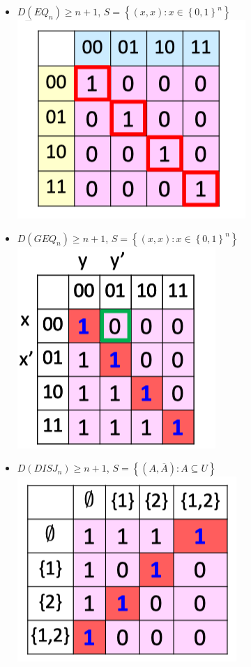 \documentclass[10pt,landscape,a4paper]{article}
\newcommand{\set}[1]{\left \{ #1 \right \}}
\begin{document}
\begin{multicols*}{3}
\begin{itemize}
    \item $D(EQ_n) \geq n + 1$, $S = \set{(x, x): x \in \set{0, 1}^n}$ \\
    \includegraphics[scale=0.5]{eq_2}
    \item $D(GEQ_n) \geq n + 1$, $S = \set{(x, x): x \in \set{0, 1}^n}$ \\
    \includegraphics[scale=0.5]{gte_2}
    \item $D(DISJ_n) \geq n + 1$, $S = \set{(A, \overline{A}): A \subseteq U}$ \\
    \includegraphics[scale=0.5]{disj_2}
\end{itemize}


\end{multicols*}
\end{document}

